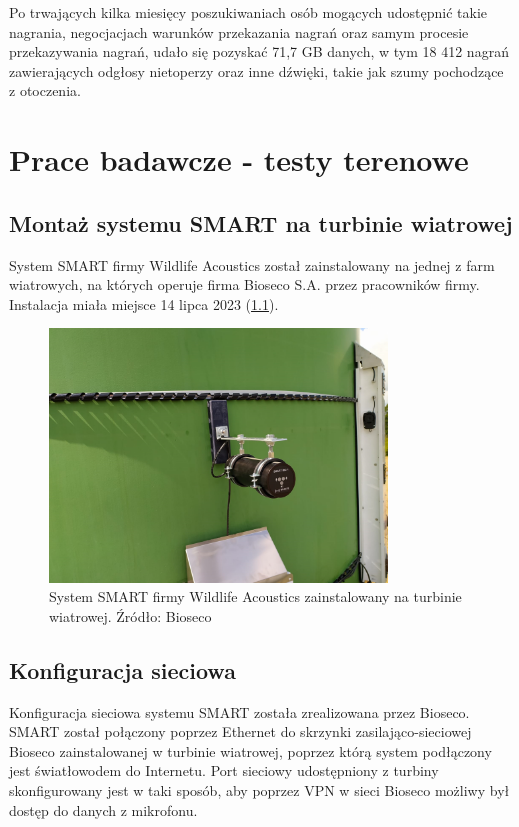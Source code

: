 \documentclass{sprz}
\begin{document}
Po trwających kilka miesięcy poszukiwaniach osób mogących udostępnić takie nagrania, negocjacjach warunków przekazania nagrań oraz samym procesie przekazywania nagrań, udało się pozyskać 71,7 GB danych, w tym 18 412 nagrań zawierających odgłosy nietoperzy oraz inne dźwięki, takie jak szumy pochodzące z otoczenia.

\chapter{Prace badawcze - testy terenowe}

\section{Montaż systemu SMART na turbinie wiatrowej}
System SMART firmy Wildlife Acoustics został zainstalowany na jednej z farm wiatrowych, na których operuje firma Bioseco S.A. przez pracowników firmy. Instalacja miała miejsce 14 lipca 2023 (\ref{img:smart-installed}). 

\begin{figure}[h]
  \centering
  \includegraphics[width=0.8\textwidth]{sprz/smart-installed.png}
  \caption{System SMART firmy Wildlife Acoustics zainstalowany na turbinie wiatrowej. Źródło: Bioseco}
  \label{img:smart-installed}
\end{figure} 

\section{Konfiguracja sieciowa}
Konfiguracja sieciowa systemu SMART została zrealizowana przez Bioseco. SMART został połączony poprzez Ethernet do skrzynki zasilająco-sieciowej Bioseco zainstalowanej w turbinie wiatrowej, poprzez którą system podłączony jest światłowodem do Internetu. Port sieciowy udostępniony z turbiny skonfigurowany jest w taki sposób, aby poprzez VPN w sieci Bioseco możliwy był dostęp do danych z mikrofonu.
\end{document}
